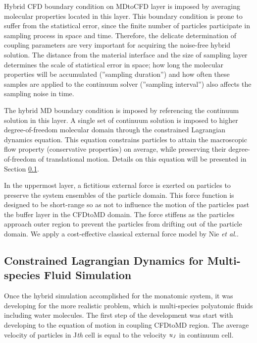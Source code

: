 \documentclass[]{aiaa-tc}%
\begin{document}
Hybrid CFD boundary condition on MDtoCFD layer is imposed by averaging
molecular properties located in this layer. This boundary condition is prone to
suffer from the statistical error\cite{Hadjicon3,Time_Mechanism}, since
the finite number of particles participate in sampling process in space and time.
Therefore, the delicate determination of coupling parameters are very important
for acquiring the noise-free hybrid solution. The distance from the material 
interface and the size of sampling layer determines the scale of statistical 
error in space; how long the molecular properties will be accumulated
(''sampling duration'') and how often these samples are applied to the 
continuum solver (''sampling interval'') also affects the sampling noise in time.

The hybrid MD boundary condition is imposed by referencing the continuum solution
in this layer. A single set of continuum solution is imposed to higher
degree-of-freedom molecular domain through the constrained Lagrangian dynamics
equation. This equation constrains particles to attain the macroscopic flow property 
(conservative properties) on average, while preserving their degree-of-freedom of 
translational motion. Details on this equation will be presented in Section
\ref{sec:hybrid_multispecies}.

In the uppermost layer, a fictitious external force is exerted on particles 
to preserve the system ensembles of the particle domain. This force function
is designed to be short-range so as not to influence the motion of the particles 
past the buffer layer in the CFDtoMD domain. The force stiffens as the particles 
approach outer region to prevent the particles from drifting out of the 
particle domain. We apply a cost-effective classical external force model 
by Nie {\it{et al.}}\cite{Nie}. 


\subsection{Constrained Lagrangian Dynamics for Multi-species Fluid Simulation}
\label{sec:hybrid_multispecies}


Once the hybrid simulation accomplished for the monatomic system, it was developing for the more realistic problem, which is multi-species polyatomic fluids including water molecules.  The first step of the development was start with developing to the equation of motion in coupling CFDtoMD region. The average velocity of particles in J{\it{th}} cell is equal to the velocity $\it u_J$ in continuum cell.
\end{document}
